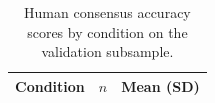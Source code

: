 \begin{table}[H]
\caption{Human consensus accuracy scores by condition on the validation subsample.}
\label{tab:reviewer:consensus:accuracy}
\centering
\begin{tabular}{lrr}
\toprule
Condition & $n$ & Mean (SD) \\
\midrule
\bottomrule
\end{tabular}
\end{table}
